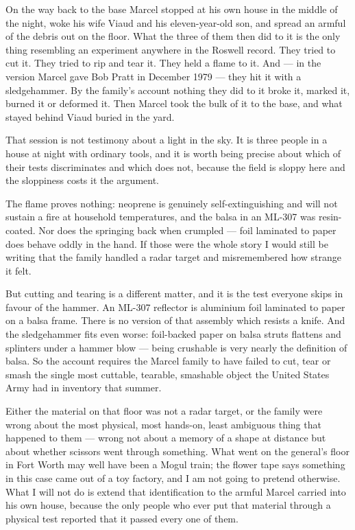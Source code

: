  On the way back to the base Marcel stopped at his own house in the middle of
the night, woke his wife Viaud and his eleven-year-old son, and spread an armful of the debris out on
the floor. What the three of them then did to it is the only thing resembling an experiment anywhere
in the Roswell record. They tried to cut it. They tried to rip and tear it. They held a flame to it.
And --- in the version Marcel gave Bob Pratt in December 1979 --- they hit it with a sledgehammer.
By the family's account nothing they did to it broke it, marked it, burned it or deformed it. Then
Marcel took the bulk of it to the base, and what stayed behind Viaud buried in the yard.

That session is not testimony about a light in the sky. It is three people in a house at night with
ordinary tools, and it is worth being precise about which of their tests discriminates and which does
not, because the field is sloppy here and the sloppiness costs it the argument. 

The flame proves nothing: neoprene is genuinely self-extinguishing and will not sustain a fire at
household temperatures, and the balsa in an ML-307 was resin-coated. Nor does the springing back when
crumpled --- foil laminated to paper does behave oddly in the hand. If those were the whole story I
would still be writing that the family handled a radar target and misremembered how strange it felt.

But cutting and tearing is a different matter, and it is the test everyone skips in favour of the
hammer. An ML-307 reflector is aluminium foil laminated to paper on a balsa frame.  There is no version of that assembly which resists a knife. And the
sledgehammer fits even worse: foil-backed paper on balsa struts flattens and splinters under a
hammer blow --- being crushable is very nearly the definition of balsa. So the account requires the
Marcel family to have failed to cut, tear or smash the single most cuttable, tearable, smashable
object the United States Army had in inventory that summer.

Either the material on that floor was not a radar target, or the family were wrong about the most
physical, most hands-on, least ambiguous thing that happened to them --- wrong not about a memory of
a shape at distance but about whether scissors went through something.  What went on the general's floor in Fort Worth may well
have been a Mogul train; the flower tape says something in this case came out of a toy factory, and
I am not going to pretend otherwise. What I will not do is extend that identification to the armful
Marcel carried into his own house, because the only people who ever put that material through a
physical test reported that it passed every one of them.

